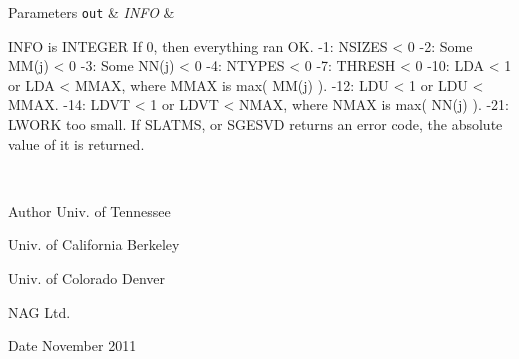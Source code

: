 \begin{DoxyParams}[1]{Parameters}
\hline
\mbox{\tt out}  & {\em I\+N\+F\+O} & \begin{DoxyVerb}          INFO is INTEGER
          If 0, then everything ran OK.
           -1: NSIZES < 0
           -2: Some MM(j) < 0
           -3: Some NN(j) < 0
           -4: NTYPES < 0
           -7: THRESH < 0
          -10: LDA < 1 or LDA < MMAX, where MMAX is max( MM(j) ).
          -12: LDU < 1 or LDU < MMAX.
          -14: LDVT < 1 or LDVT < NMAX, where NMAX is max( NN(j) ).
          -21: LWORK too small.
          If  SLATMS, or SGESVD returns an error code, the
              absolute value of it is returned.\end{DoxyVerb}
 \\
\hline
\end{DoxyParams}
\begin{DoxyAuthor}{Author}
Univ. of Tennessee 

Univ. of California Berkeley 

Univ. of Colorado Denver 

N\+A\+G Ltd. 
\end{DoxyAuthor}
\begin{DoxyDate}{Date}
November 2011 
\end{DoxyDate}
\hypertarget{group__single__eig_ga1f741a939ab68209bb2d6028538da0c1}{}
